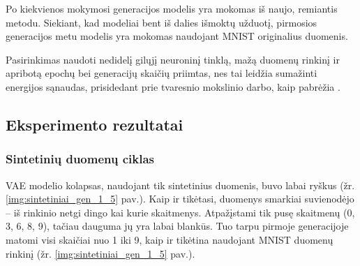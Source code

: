 \documentclass{VUMIFInfKursinis}
\begin{document}
Po kiekvienos mokymosi generacijos modelis yra mokomas iš naujo, remiantis \cite{ModelsGoMAD} metodu. Siekiant, kad modeliai bent iš dalies išmoktų užduotį, pirmosios generacijos metu modelis yra mokomas naudojant MNIST originalius duomenis. 




Pasirinkimas naudoti nedidelį gilųjį neuroninį tinklą, mažą duomenų rinkinį ir apribotą epochų bei generacijų skaičių priimtas, nes tai leidžia sumažinti energijos sąnaudas, prisidedant prie tvaresnio mokslinio darbo, kaip pabrėžia \cite{energy_2019}. 




\subsection{Eksperimento rezultatai}

\subsubsection{Sintetinių duomenų ciklas}
VAE modelio kolapsas, naudojant tik sintetinius duomenis, buvo labai ryškus (žr. \ref{img:sintetiniai_gen_1_5} pav.). Kaip ir tikėtasi, duomenys smarkiai suvienodėjo – iš rinkinio netgi dingo kai kurie skaitmenys. Atpažįstami tik pusę skaitmenų (0, 3, 6, 8, 9), tačiau dauguma jų yra labai blankūs. Tuo tarpu pirmoje generacijoje matomi visi skaičiai nuo 1 iki 9, kaip ir tikėtina naudojant MNIST duomenų rinkinį (žr. \ref{img:sintetiniai_gen_1_5} pav.).
\end{document}
